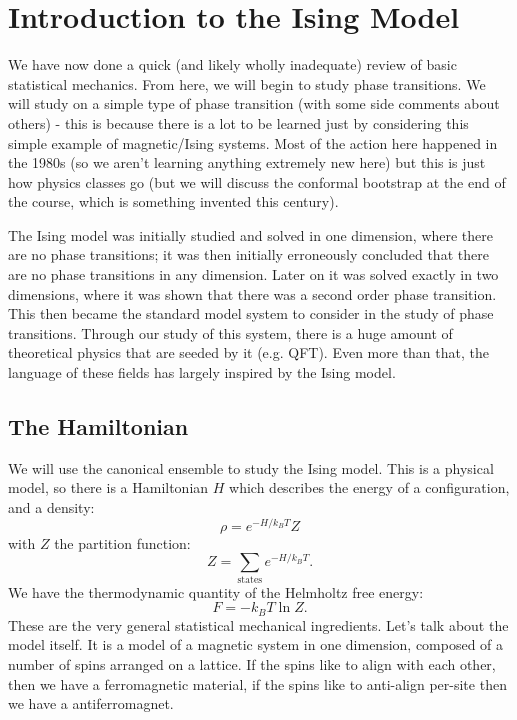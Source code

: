 \section{Introduction to the Ising Model}
We have now done a quick (and likely wholly inadequate) review of basic statistical mechanics. From here, we will begin to study phase transitions. We will study on a simple type of phase transition (with some side comments about others) - this is because there is a lot to be learned just by considering this simple example of magnetic/Ising systems. Most of the action here happened in the 1980s (so we aren't learning anything extremely new here) but this is just how physics classes go (but we will discuss the conformal bootstrap at the end of the course, which is something invented this century).

The Ising model was initially studied and solved in one dimension, where there are no phase transitions; it was then initially erroneously concluded that there are no phase transitions in any dimension. Later on it was solved exactly in two dimensions, where it was shown that there was a second order phase transition. This then became the standard model system to consider in the study of phase transitions. Through our study of this system, there is a huge amount of theoretical physics that are seeded by it (e.g. QFT). Even more than that, the language of these fields has largely inspired by the Ising model.

\subsection{The Hamiltonian}
We will use the canonical ensemble to study the Ising model. This is a physical model, so there is a Hamiltonian $H$ which describes the energy of a configuration, and a density:
\begin{equation}
    \rho = e^{-H/k_B T}{Z}
\end{equation} 
with $Z$ the partition function:
\begin{equation}
    Z = \sum_{\text{states}}e^{-H/k_B T}.
\end{equation}
We have the thermodynamic quantity of the Helmholtz free energy:
\begin{equation}
    F = -k_B T \ln Z.
\end{equation}
These are the very general statistical mechanical ingredients. Let's talk about the model itself. It is a model of a magnetic system in one dimension, composed of a number of spins arranged on a lattice. If the spins like to align with each other, then we have a ferromagnetic material, if the spins like to anti-align per-site then we have a antiferromagnet.

